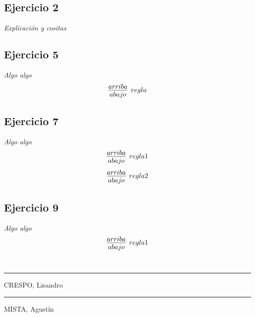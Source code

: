 \documentclass[a4paper,10pt]{article}
\begin{document}
\subsection*{Ejercicio 2} 
	\emph{Explicación y cositas}
	\\
\subsection*{Ejercicio 5} 
	\emph{Algo algo}
	\\
	\begin{align*}
		\infer[regla]{
			abajo
		}{
			arriba
		}
	\end{align*}
\subsection*{Ejercicio 7} 
	\emph{Algo algo}
	\\
	\begin{align*}
		\infer[regla1]{
			abajo
		}{
			arriba
		}
	\end{align*}
	\begin{align*}
		\infer[regla2]{
			abajo
		}{
			arriba
		}
	\end{align*}
\subsection*{Ejercicio 9} 
	\emph{Algo algo}
	\\
	\begin{align*}
		\infer[regla1]{
			abajo
		}{
			arriba
		}
	\end{align*}
\pagebreak  %
\\
\vspace{\fill}
\begin{multicols}{2}
	\hrule
	\vspace{5pt}
	CRESPO, Lisandro \\
	\linebreak
	\hrule
	\vspace{5pt}
	MISTA, Agustín \\
\end{multicols}
\end{document}
